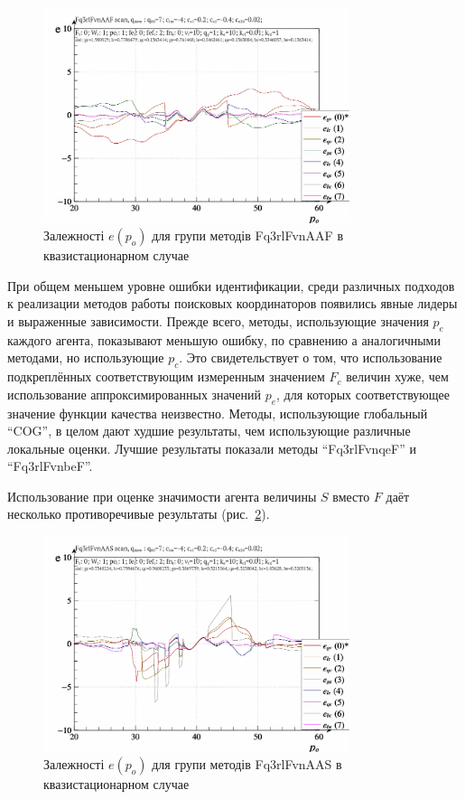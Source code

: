 \begin{figure}[htb!]
  \begin{center}
    \includegraphics[width=0.8\textwidth]{p/scan/qls-p_p_e_Fq3rlFvnAAF_scan.png}
  \end{center}
  \caption{Залежності $e(p_o)$ для групи методів Fq3rlFvnAAF в квазистационарном случае}
  \label{atu:f:Fq3rlFvnAAF_scan}
\end{figure}

При общем меньшем уровне ошибки идентификации, среди различных подходов
к реализации методов работы поисковых координаторов появились явные лидеры и
выраженные зависимости. Прежде всего, методы, использующие значения $p_e$
каждого агента, показывают меньшую ошибку, по сравнению а аналогичными методами,
но использующие $p_c$. Это свидетельствует о том, что
использование подкреплённых соответствующим измеренным значением $F_c$ величин
хуже, чем использование аппроксимированных значений $p_e$,
для которых соответствующее значение функции качества неизвестно.
Методы, использующие глобальный ``COG'', в целом
дают худшие результаты, чем использующие различные локальные оценки.
Лучшие результаты показали методы
``Fq3rlFvnqeF'' и ``Fq3rlFvnbeF''.

Использование при оценке значимости агента величины $S$ вместо $F$
даёт несколько противоречивые результаты (рис.~\ref{atu:f:Fq3rlFvnAAS_scan}).

\begin{figure}[htb!]
  \begin{center}
    \includegraphics[width=0.8\textwidth]{p/scan/qls-p_p_e_Fq3rlFvnAAS_scan.png}
  \end{center}
  \caption{Залежності $e(p_o)$ для групи методів Fq3rlFvnAAS в квазистационарном случае}
  \label{atu:f:Fq3rlFvnAAS_scan}
\end{figure}

